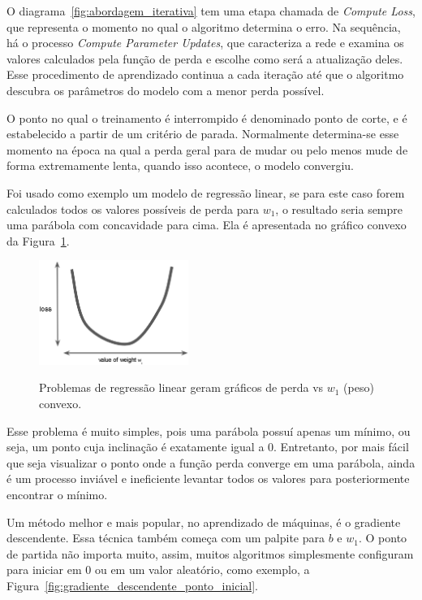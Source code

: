             O diagrama~\ref{fig:abordagem_iterativa} tem uma etapa chamada de \textit{Compute Loss}, que representa o momento no qual o algoritmo determina o erro. Na sequência, há o processo \textit{Compute Parameter Updates}, que caracteriza a rede e examina os valores calculados pela função de perda e escolhe como será a atualização deles. Esse procedimento de aprendizado continua a cada iteração até que o algoritmo descubra os parâmetros do modelo com a menor perda possível. 
            
            O ponto no qual o treinamento é interrompido é denominado ponto de corte, e é estabelecido a partir de um critério de parada. Normalmente determina-se esse momento na época na qual a perda geral para de mudar ou pelo menos mude de forma extremamente lenta, quando isso acontece, o modelo convergiu.
            
            Foi usado como exemplo um modelo de regressão linear, se para este caso forem calculados todos os valores possíveis de perda para $w_1$, o resultado seria sempre uma parábola com concavidade para cima. Ela é apresentada no gráfico convexo da Figura~\ref{fig:convexo}.
    
            \begin{figure}[H]
                \centering
                \caption{Problemas de regressão linear geram gráficos de perda vs $w_1$ (peso) convexo.}
                \includegraphics[width=0.435\textwidth]{fig/2-fundamentacao/aprendizado/convexo.png}
                \label{fig:convexo}
            \end{figure}
            
            Esse problema é muito simples, pois uma parábola possuí apenas um mínimo, ou seja, um ponto cuja inclinação é exatamente igual a 0. Entretanto, por mais fácil que seja visualizar o ponto onde a função perda converge em uma parábola, ainda é um processo inviável e ineficiente levantar todos os valores para posteriormente encontrar o mínimo.
            
            Um método melhor e mais popular, no aprendizado de máquinas, é o gradiente descendente. Essa técnica também começa com um palpite para $b$ e $w_1$. O ponto de partida não importa muito, assim, muitos algoritmos simplesmente configuram para iniciar em 0 ou em um valor aleatório, como exemplo, a Figura~\ref{fig:gradiente_descendente_ponto_inicial}. 
    
